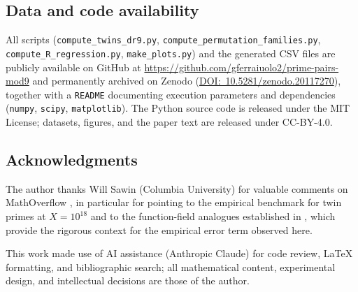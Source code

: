 \documentclass[11pt]{amsart}
\theoremstyle{plain}
\theoremstyle{definition}
\theoremstyle{remark}
\begin{document}
\subsection*{Data and code availability}
All scripts (\texttt{compute\_twins\_dr9.py},
\texttt{compute\_permutation\_families.py},
\texttt{compute\_R\_regression.py}, \texttt{make\_plots.py}) and the
generated CSV files are publicly available on GitHub at
\url{https://github.com/gferraiuolo2/prime-pairs-mod9}
and permanently archived on Zenodo
(\href{https://doi.org/10.5281/zenodo.20117270}{DOI:~10.5281/zenodo.20117270}),
together with a \texttt{README} documenting execution parameters and
dependencies (\texttt{numpy}, \texttt{scipy}, \texttt{matplotlib}).
The Python source code is released under the MIT License; datasets,
figures, and the paper text are released under CC-BY-4.0.

\subsection*{Acknowledgments}
The author thanks Will Sawin (Columbia University) for valuable
comments on MathOverflow \cite{MO_question}, in particular for
pointing to the empirical benchmark for twin primes at $X = 10^{18}$
and to the function-field analogues established in \cite{SS22},
which provide the rigorous context for the empirical error term
observed here.

This work made use of AI assistance (Anthropic Claude) for code
review, LaTeX formatting, and bibliographic search; all mathematical
content, experimental design, and intellectual decisions are those of
the author.
\end{document}

